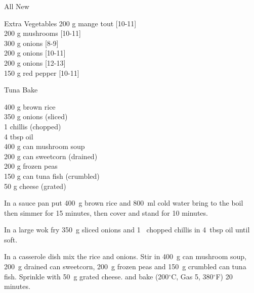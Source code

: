 \begin{menu}{All New}
\begin{shoppinglist}{Extra Vegetables}
      200 g mange tout 
        {\scriptsize[10-11]}\\
      200 g mushrooms 
        {\scriptsize[10-11]}\\
      300 g onions 
        {\scriptsize[8-9]}\\
      200 g onions 
        {\scriptsize[10-11]}\\
      200 g onions 
        {\scriptsize[12-13]}\\
      150 g red pepper 
        {\scriptsize[10-11]}\\
      \end{shoppinglist}%
      \par\vfil %
    \vfil\clearpage
  
    \begin{recipe}{2}{Tuna Bake}%
    
		\begin{ingredients}
		400 g brown rice  \\
	350 g onions (sliced) \\
	1  chillis (chopped) \\
	4 tbsp oil  \\
	400 g can mushroom soup  \\
	200 g can sweetcorn (drained) \\
	200 g frozen peas  \\
	150 g can tuna fish (crumbled) \\
	50 g cheese (grated) \\
	
		\end{ingredients}
	
    \begin{instructions}
    \item 
      In a
      sauce pan
      put
      400~g  brown rice
      and
      800~ml  cold water
      bring to the boil then simmer for 15 minutes,
      then cover and stand for 10 minutes.
    \item 
        In a large wok fry
        350~g sliced onions
        and
        1~ chopped chillis
        in
        4~tbsp  oil
        until soft.
      \item 
        In a casserole dish mix
        the rice and onions.
        Stir in
        400~g  can mushroom soup,
        200~g drained can sweetcorn,
        200~g  frozen peas
        and
        150~g crumbled can tuna fish.
        Sprinkle with
        50~g grated cheese.
        and
        bake 
      (200$^{\circ}$C, Gas 5, 380$^{\circ}$F)
     20 minutes.
      

\end{instructions}
\end{recipe}
\end{menu}
